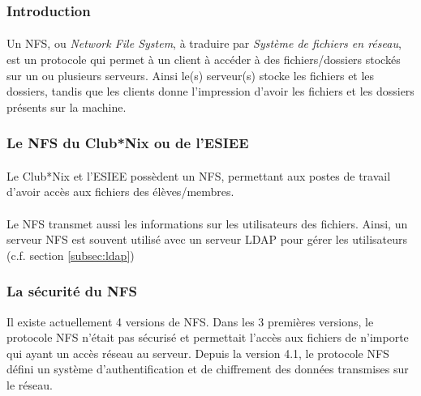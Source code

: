 \subsubsection{Introduction}

\paragraph{} Un NFS, ou \textit{Network File System}, à traduire par
\textit{Système de fichiers en réseau}, est un protocole qui permet à un client
à accéder à des fichiers/dossiers stockés sur un ou plusieurs serveurs. Ainsi
le(s) serveur(s) stocke les fichiers et les dossiers, tandis que les clients
donne l'impression d'avoir les fichiers et les dossiers présents sur la
machine.

\subsubsection{Le NFS du Club*Nix ou de l'ESIEE}

\paragraph{} Le Club*Nix et l'ESIEE possèdent un NFS, permettant aux postes de
travail d'avoir accès aux fichiers des élèves/membres.

\paragraph{} Le NFS transmet aussi les informations sur les utilisateurs des
fichiers. Ainsi, un serveur NFS est souvent utilisé avec un serveur LDAP pour
gérer les utilisateurs (c.f. section \ref{subsec:ldap})

\subsubsection{La sécurité du NFS}

Il existe actuellement 4 versions de NFS. Dans les 3 premières versions, le
protocole NFS n'était pas sécurisé et permettait l'accès aux fichiers de
n'importe qui ayant un accès réseau au serveur. Depuis la version 4.1, le
protocole NFS défini un système d'authentification et de chiffrement des
données transmises sur le réseau.
